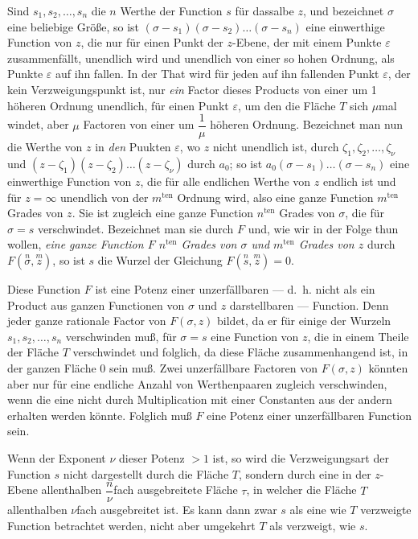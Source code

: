 \documentclass{article}
\begin{document}
Sind $s_{1}, s_{2}, \ldots, s_{n}$ die $n$ Werthe der Function $s$ für dassalbe $z$, und bezeichnet $\sigma$ eine beliebige Größe, so ist $(\sigma-s_{1})(\sigma-s_{2}) \ldots (\sigma-s_{n})$ eine einwerthige Function von $z$, die nur für einen Punkt der $z$-Ebene, der mit einem Punkte $\varepsilon$ zusammenfällt, unendlich wird und unendlich von einer so hohen Ordnung, als Punkte $\varepsilon$ auf ihn fallen. In der That wird für jeden auf ihn fallenden Punkt $\varepsilon$, der kein Verzweigungspunkt ist, nur \emph{ein} Factor dieses Products von einer um 1 höheren Ordnung unendlich, für einen Punkt $\varepsilon$, um den die Fläche $T$ sich $\mu$mal windet, aber $\mu$ Factoren von einer um $\dfrac{1}{\mu}$ höheren Ordnung. Bezeichnet man nun die Werthe von $z$ in \emph{den} Puukten $\varepsilon$, wo $z$ nicht unendlich ist, durch $\zeta_{1}, \zeta_{2}, \ldots, \zeta_{\nu}$ und $(z-\zeta_{1})(z-\zeta_{2}) \ldots (z-\zeta_{\nu})$ durch $a_{0}$; so ist $a_{0}(\sigma-s_{1}) \ldots (\sigma-s_{n})$ eine einwerthige Function von $z$, die für alle endlichen Werthe von $z$ endlich ist und für $z = \infty$ unendlich von der $m^{\text{ten}}$ Ordnung wird, also eine ganze Function $m^{\text{ten}}$ Grades von $z$. Sie ist zugleich eine ganze Function $n^{\text{ten}}$ Grades von $\sigma$, die für $\sigma = s$ verschwindet. Bezeichnet man sie durch $F$ und, wie wir in der Folge thun wollen, \emph{eine ganze Function $F$ $n^{\text{ten}}$ Grades von $\sigma$ und $m^{\text{ten}}$ Grades von $z$} durch $F(\overset{n}{\sigma}, \overset{m}{z})$, so ist $s$ die Wurzel der Gleichung $F(\overset{n}{s}, \overset{m}{z}) = 0$.

Diese Function $F$ ist eine Potenz einer unzerfällbaren --- d.~h. nicht als ein Product aus ganzen Functionen von $\sigma$ und $z$ darstellbaren --- Function. Denn jeder ganze rationale Factor von $F(\sigma, z)$ bildet, da er für einige der Wurzeln $s_{1}, s_{2}, \ldots, s_{n}$ verschwinden muß, für $\sigma = s$ eine Function von $z$, die in einem Theile der Fläche $T$ verschwindet und folglich, da diese Fläche zusammenhangend ist, in der ganzen Fläche 0 sein muß. Zwei unzerfällbare Factoren von $F(\sigma, z)$ könnten aber nur für eine endliche Anzahl von Werthenpaaren zugleich verschwinden, wenn die eine nicht durch Multiplication mit einer Constanten aus der andern erhalten werden könnte. Folglich muß $F$ eine Potenz einer unzerfällbaren Function sein.

Wenn der Exponent $\nu$ dieser Potenz $> 1$ ist, so wird die Verzweigungsart der Function $s$ nicht dargestellt durch die Fläche $T$, sondern durch eine in der $z$-Ebene allenthalben $\dfrac{n}{\nu}$fach ausgebreitete Fläche $\tau$, in welcher die Fläche $T$ allenthalben $\nu$fach ausgebreitet ist. Es kann dann zwar $s$ als eine wie $T$ verzweigte Function betrachtet werden, nicht aber umgekehrt $T$ als verzweigt, wie $s$.
\end{document}
